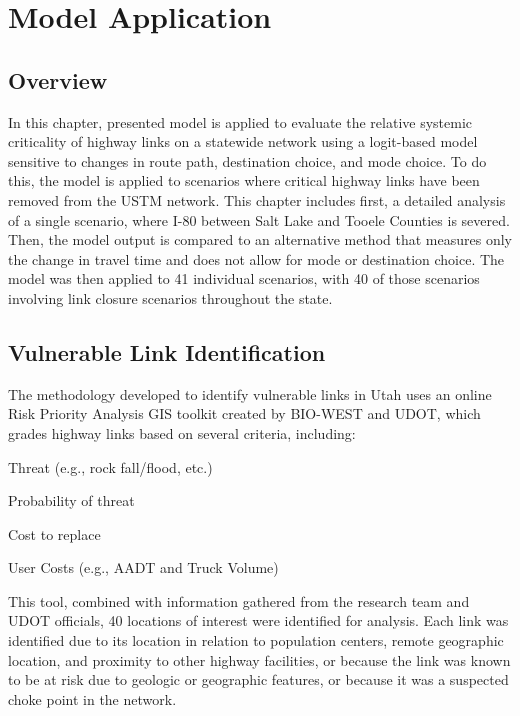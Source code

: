 \chapter{Model Application}
\label{chp:chapter4}
\graphicspath{{figures/}{figures/chapter4/}}

\section{Overview}
In this chapter, presented model is applied to evaluate the relative systemic
criticality of highway links on a statewide network using a logit-based model
sensitive to changes in route path, destination choice, and mode choice. To do this, the model is applied to scenarios
where critical highway links have been removed from the USTM network. This
chapter includes first, a detailed analysis of a single scenario, where I-80
between Salt Lake and Tooele Counties is severed. Then, the model
output is compared to an alternative method that measures only the change in travel
time and does not allow for mode or destination choice. The model was then
applied to 41 individual scenarios, with 40 of those scenarios involving link
closure scenarios throughout the state.

\section{Vulnerable Link Identification}
The methodology developed to identify vulnerable links in Utah uses an online Risk Priority Analysis GIS toolkit created by BIO-WEST and UDOT, which grades highway links based on several criteria, including:

\begin{description}
   \item {Threat (e.g., rock fall/flood, etc.)}
   \item {Probability of threat}
   \item {Cost to replace}
   \item {User Costs (e.g., AADT and Truck Volume)}
\end{description}

This tool, combined with information gathered from the research team and UDOT officials, 40 locations of interest were identified for analysis. Each link was identified due to its location in relation to
population centers, remote geographic location, and proximity to other highway facilities, or because the link was known to be at risk due to geologic or geographic features, or
because it was a suspected choke point in the network.


